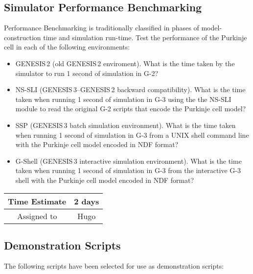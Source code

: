 \documentclass[12pt]{article}
\begin{document}
\subsection{Simulator Performance Benchmarking}

Performance Benchmarking is traditionally classified in phases of
model-construction time and simulation run-time.  Test the performance
of the Purkinje cell in each of the following environments:

\begin{itemize}
\item GENESIS\,2 (old GENESIS\,2 enviroment).  What is the time taken
  by the simulator to run 1 second of simulation in G-2?
\item NS-SLI (GENESIS\,3--GENESIS\,2 backward compatibility).  What is
  the time taken when running 1 second of simulation in G-3 using the
  the NS-SLI module to read the original G-2 scripts that encode the
  Purkinje cell model?
\item SSP (GENESIS\,3 batch simulation environment).  What is the time
  taken when running 1 second of simulation in G-3 from a UNIX shell
  command line with the Purkinje cell model encoded in NDF format?
\item G-Shell (GENESIS\,3 interactive simulation environment).  What
  is the time taken when running 1 second of simulation in G-3 from
  the interactive G-3 shell with the Purkinje cell model encoded in
  NDF format?
\end{itemize}

\begin{center}
  \vspace{5mm}
  \centering
  \begin{tabular}{|c|c|}
    \hline
    Time Estimate
    & 2 days \\
    \hline
    Assigned to
    & Hugo \\
    \hline
  \end{tabular}
\end{center}


\subsection{Demonstration Scripts}

The following scripts have been selected for use as demonstration
scripts:
\end{document}

